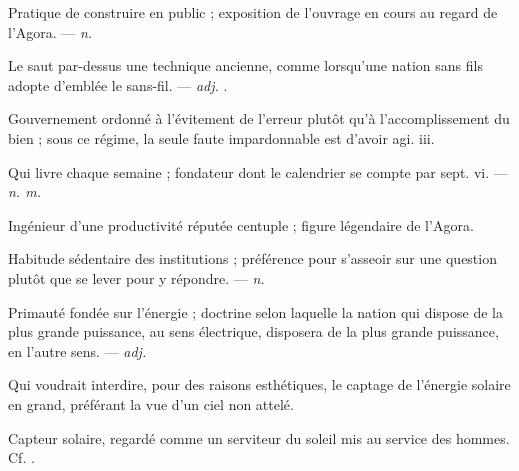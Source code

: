  Pratique de construire en public ; exposition de l'ouvrage en cours au regard de l'Agora.  ---  \textit{n.}

 Le saut par-dessus une technique ancienne, comme lorsqu'une nation sans fils adopte d'emblée le sans-fil. ---  \textit{adj.} .

 Gouvernement ordonné à l'évitement de l'erreur plutôt qu'à l'accomplissement du bien ; sous ce régime, la seule faute impardonnable est d'avoir agi.   iii.

 Qui livre chaque semaine ; fondateur dont le calendrier se compte par sept.   vi. ---  \textit{n. m.}

 Ingénieur d'une productivité réputée centuple ; figure légendaire de l'Agora.  

 Habitude sédentaire des institutions ; préférence pour s'asseoir sur une question plutôt que se lever pour y répondre. ---  \textit{n.}

 Primauté fondée sur l'énergie ; doctrine selon laquelle la nation qui dispose de la plus grande puissance, au sens électrique, disposera de la plus grande puissance, en l'autre sens. ---  \textit{adj.}

  Qui voudrait interdire, pour des raisons esthétiques, le captage de l'énergie solaire en grand, préférant la vue d'un ciel non attelé.

 Capteur solaire, regardé comme un serviteur du soleil mis au service des hommes.  Cf. .

